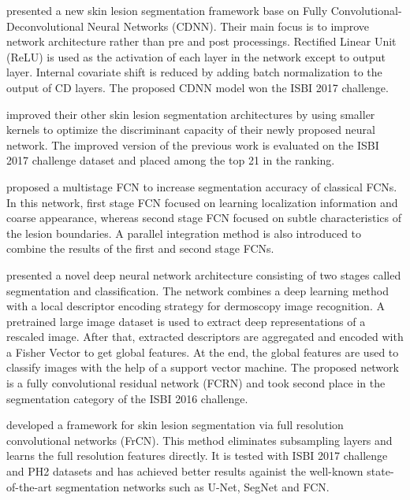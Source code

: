     \citet{yuan2017automatic2} presented a new skin lesion segmentation framework base on Fully Convolutional-Deconvolutional Neural Networks (CDNN).
    Their main focus is to improve network architecture rather than pre and post processings.
    Rectified Linear Unit (ReLU) is used as the activation of each layer in the network except to output layer.
    Internal covariate shift is reduced by adding batch normalization to the output of CD layers.
    The proposed CDNN model won the ISBI 2017 challenge.

    \citet{yuan2017improving} improved their other skin lesion segmentation architectures by using smaller kernels to optimize the discriminant capacity of their newly proposed neural network.
    The improved version of the previous work is evaluated on the ISBI 2017 challenge dataset and placed among the top 21 in the ranking.

    \citet{bi2017dermoscopic} proposed a multistage FCN to increase segmentation accuracy of classical FCNs.
    In this network, first stage FCN focused on learning localization information and coarse appearance,
    whereas second stage FCN focused on subtle characteristics of the lesion boundaries.
    A parallel integration method is also introduced to combine the results of the first and second stage FCNs.

    \citet{yu2018melanoma} presented a novel deep neural network architecture  consisting of two stages called segmentation and classification.
    The network combines a deep learning method with a local descriptor encoding strategy for dermoscopy image recognition.
    A pretrained large image dataset is used to extract deep representations of a rescaled image.
    After that, extracted descriptors are aggregated and encoded with a Fisher Vector to get global features.
    At the end, the global features are used to classify images with the help of a support vector machine.
    The proposed network is a fully convolutional residual network (FCRN) and took second place in the segmentation category of the ISBI 2016 challenge.

    \citet{al2018skin} developed a framework for skin lesion segmentation via full resolution convolutional networks (FrCN).
    This method eliminates subsampling layers and learns the full resolution features directly.
    It is tested with ISBI 2017 challenge and PH2 datasets and has achieved better results againist the well-known state-of-the-art segmentation networks such as U-Net, SegNet and FCN.

